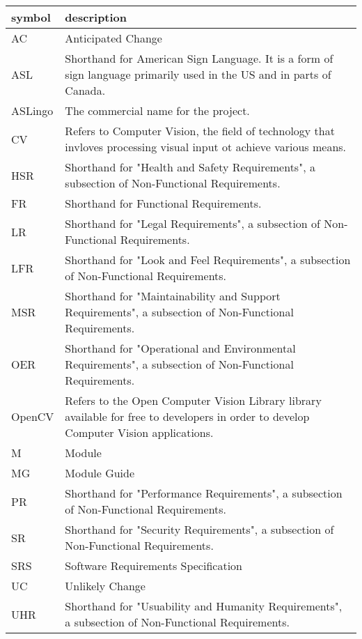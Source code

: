\documentclass[12pt, titlepage]{article}
\begin{document}
\renewcommand{\arraystretch}{1.2}
\begin{tabular}{|p{3cm}|p{13cm}|} 
  \toprule		
  \textbf{symbol} & \textbf{description}\\
  \midrule 
  AC & Anticipated Change\\
  ASL & Shorthand for American Sign Language. It is a form of sign language primarily used in the US and in parts of Canada. \\
  ASLingo & The commercial name for the project. \\
  CV & Refers to Computer Vision, the field of technology that invloves processing visual input ot achieve various means. \\
  HSR & Shorthand for "Health and Safety Requirements", a subsection of Non-Functional Requirements. \\
  FR & Shorthand for Functional Requirements. \\
  LR & Shorthand for "Legal Requirements", a subsection of Non-Functional Requirements. \\
  LFR & Shorthand for "Look and Feel Requirements", a subsection of Non-Functional Requirements. \\
  MSR & Shorthand for "Maintainability and Support Requirements", a subsection of Non-Functional Requirements. \\
  OER & Shorthand for "Operational and Environmental Requirements", a subsection of Non-Functional Requirements. \\
  OpenCV & Refers to the Open Computer Vision Library library available for free to developers in order to develop Computer Vision applications. \\
  M & Module \\
  MG & Module Guide \\
  PR & Shorthand for "Performance Requirements", a subsection of Non-Functional Requirements. \\
  SR & Shorthand for "Security Requirements", a subsection of Non-Functional Requirements. \\
  SRS & Software Requirements Specification\\
  UC & Unlikely Change \\
  UHR & Shorthand for "Usuability and Humanity Requirements", a subsection of Non-Functional Requirements. \\
  \bottomrule
\end{tabular}\\

\newpage
\end{document}
